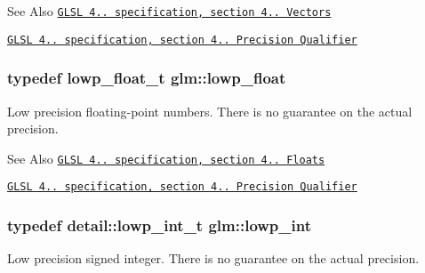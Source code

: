 \begin{DoxySeeAlso}{See Also}
\href{http://www.opengl.org/registry/doc/GLSLangSpec.4.20.8.pdf}{\tt G\-L\-S\-L 4.. specification, section 4.. Vectors} 

\href{http://www.opengl.org/registry/doc/GLSLangSpec.4.20.8.pdf}{\tt G\-L\-S\-L 4.. specification, section 4.. Precision Qualifier} 
\end{DoxySeeAlso}
\hypertarget{group__core__precision_ga2887fbc729ac5c1c5caeb7cd57a7145c}{
\subsubsection[{lowp\-\_\-float}]{\setlength{\rightskip}{0pt plus 5cm}typedef lowp\-\_\-float\-\_\-t {\bf glm\-::lowp\-\_\-float}}}\label{group__core__precision_ga2887fbc729ac5c1c5caeb7cd57a7145c}
Low precision floating-\/point numbers. There is no guarantee on the actual precision.

\begin{DoxySeeAlso}{See Also}
\href{http://www.opengl.org/registry/doc/GLSLangSpec.4.20.8.pdf}{\tt G\-L\-S\-L 4.. specification, section 4.. Floats} 

\href{http://www.opengl.org/registry/doc/GLSLangSpec.4.20.8.pdf}{\tt G\-L\-S\-L 4.. specification, section 4.. Precision Qualifier} 
\end{DoxySeeAlso}
\hypertarget{group__core__precision_ga4681244bf4a184734f03aa9df4e3d288}{
\subsubsection[{lowp\-\_\-int}]{\setlength{\rightskip}{0pt plus 5cm}typedef detail\-::lowp\-\_\-int\-\_\-t {\bf glm\-::lowp\-\_\-int}}}\label{group__core__precision_ga4681244bf4a184734f03aa9df4e3d288}
Low precision signed integer. There is no guarantee on the actual precision.

